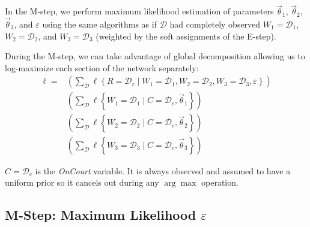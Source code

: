 \documentclass[10pt,twocolumn]{article}
\newcommand{\prb}[1]{\ensuremath{  \mathrm{Pr}\left\{ #1 \right\}  }}
\begin{document}
In the M-step, we perform maximum likelihood estimation of parameters $\vec \theta_1$, $\vec \theta_2$, $\vec \theta_3$, and $\varepsilon$ using the same algorithms as if $\mathcal{D}$ had completely observed $W_1 = \mathcal{D}_1$, $W_2= \mathcal{D}_2$, and $W_3= \mathcal{D}_3$ (weighted by the soft assignments of the E-step).

During the M-step, we can take advantage of global decomposition allowing us to log-maximize each section of the network separately:
\begin{align*}
\ell = & \left( \sum_{\mathcal{D}} \ell\left\{R = \mathcal{D}_r \mid W_1 = \mathcal{D}_1, W_2 = \mathcal{D}_2, W_3 = \mathcal{D}_3, \varepsilon\right\} \right)
\\ & \left( \sum_{\mathcal{D}} \ell\left\{W_1 = \mathcal{D}_1 \mid C = \mathcal{D}_c, \vec \theta_1\right\} \right)
\\ & \left( \sum_{\mathcal{D}} \ell\left\{W_2 = \mathcal{D}_2 \mid C = \mathcal{D}_c,\vec \theta_2\right\} \right)
\\ & \left( \sum_{\mathcal{D}} \ell\left\{W_3 = \mathcal{D}_3 \mid C = \mathcal{D}_c,\vec \theta_3\right\} \right)
\end{align*}%

$ C = \mathcal{D}_c$ is the \emph{OnCourt} variable. It is always observed and assumed to have a uniform prior so it cancels out during any $\arg\max$ operation.


\subsection{M-Step: Maximum Likelihood $\varepsilon$}
\end{document}
